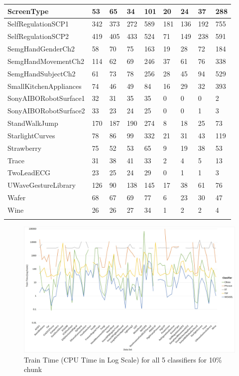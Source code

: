 \begin{landscape}
\begin{longtable}{|l|llll|llll|}
      ScreenType & 53 & 65 & 34 & 101 & 20 & 24 & 37 & 288 \\ \hline
      SelfRegulationSCP1 & 342 & 373 & 272 & 589 & 181 & 136 & 192 & 755 \\ \hline
      SelfRegulationSCP2 & 419 & 405 & 433 & 524 & 71 & 149 & 238 & 591 \\ \hline
      SemgHandGenderCh2 & 58 & 70 & 75 & 163 & 19 & 28 & 72 & 184 \\ \hline
      SemgHandMovementCh2 & 114 & 62 & 69 & 246 & 37 & 61 & 76 & 338 \\ \hline
      SemgHandSubjectCh2 & 61 & 73 & 78 & 256 & 28 & 45 & 94 & 529 \\ \hline
      SmallKitchenAppliances & 74 & 46 & 49 & 84 & 16 & 29 & 32 & 393 \\ \hline
      SonyAIBORobotSurface1 & 32 & 31 & 35 & 35 & 0 & 0 & 0 & 2 \\ \hline
      SonyAIBORobotSurface2 & 33 & 23 & 24 & 25 & 0 & 0 & 1 & 3 \\ \hline
      StandWalkJump & 170 & 187 & 190 & 274 & 8 & 18 & 25 & 73 \\ \hline
      StarlightCurves & 78 & 86 & 99 & 332 & 21 & 31 & 43 & 119 \\ \hline
      Strawberry & 75 & 52 & 53 & 65 & 9 & 19 & 38 & 53 \\ \hline
      Trace & 31 & 38 & 41 & 33 & 2 & 4 & 5 & 13 \\ \hline
      TwoLeadECG & 23 & 25 & 24 & 29 & 0 & 1 & 1 & 3 \\ \hline
      UWaveGestureLibrary & 126 & 90 & 138 & 145 & 17 & 38 & 61 & 76 \\ \hline
      Wafer & 68 & 67 & 69 & 77 & 6 & 23 & 30 & 47 \\ \hline
      Wine & 26 & 26 & 27 & 34 & 1 & 2 & 2 & 4 \\ \hline
      \label{tab:longduration_1}
    \end{longtable}
\end{landscape}

  \begin{figure} [!htb]
    \centering
    \includegraphics[width=\textwidth]{./Chapters/06 Results/Duration_10pct.jpg}
    \caption{Train Time (CPU Time in Log Scale) for all 5 classifiers for 10\% chunk}
    \label{fig:Duration10Line}
  \end{figure}
  
